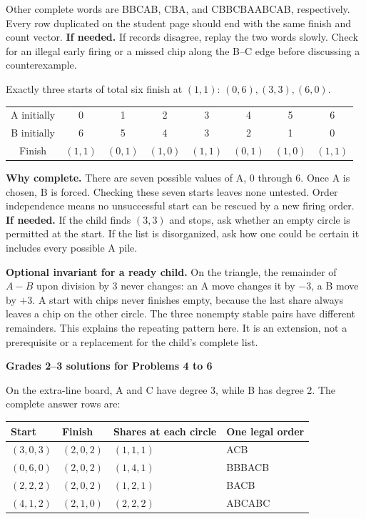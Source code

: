 \documentclass[11pt,letterpaper]{article}
\newcommand{\pagehead}[1]{{\Large\bfseries #1}\par\vspace{3pt}}
\newcommand{\prob}[2]{\par\vspace{5pt}{\large\bfseries #1}\par #2}
\newcommand{\hint}[1]{\textbf{If needed.} #1\par}
\begin{document}
Other complete words are BBCAB, CBA, and CBBCBAABCAB, respectively. Every row duplicated on the student page should end with the same finish and count vector.
\hint{If records disagree, replay the two words slowly. Check for an illegal early firing or a missed chip along the B--C edge before discussing a counterexample.}
\prob{Problem 3}{Exactly three starts of total six finish at $(1,1)$: $(0,6),(3,3),(6,0)$.}
\begin{center}\begin{tabular}{cccccccc}\toprule
A initially&0&1&2&3&4&5&6\\
B initially&6&5&4&3&2&1&0\\\midrule
Finish&$(1,1)$&$(0,1)$&$(1,0)$&$(1,1)$&$(0,1)$&$(1,0)$&$(1,1)$\\\bottomrule\end{tabular}\end{center}
\textbf{Why complete.} There are seven possible values of A, 0 through 6. Once A is chosen, B is forced. Checking these seven starts leaves none untested. Order independence means no unsuccessful start can be rescued by a new firing order.
\hint{If the child finds $(3,3)$ and stops, ask whether an empty circle is permitted at the start. If the list is disorganized, ask how one could be certain it includes every possible A pile.}
\textbf{Optional invariant for a ready child.} On the triangle, the remainder of $A-B$ upon division by 3 never changes: an A move changes it by $-3$, a B move by $+3$. A start with chips never finishes empty, because the last share always leaves a chip on the other circle. The three nonempty stable pairs have different remainders. This explains the repeating pattern here. It is an extension, not a prerequisite or a replacement for the child's complete list.

\newpage
\pagehead{Grades 2--3 solutions for Problems 4 to 6}\label{middleextra}
\prob{Problem 4}{On the extra-line board, A and C have degree 3, while B has degree 2. The complete answer rows are:}
\begin{center}\begin{tabular}{llll}\toprule Start & Finish & Shares at each circle & One legal order\\\midrule
$(3,0,3)$ & $(2,0,2)$ & $(1,1,1)$ & ACB\\
$(0,6,0)$ & $(2,0,2)$ & $(1,4,1)$ & BBBACB\\
$(2,2,2)$ & $(2,0,2)$ & $(1,2,1)$ & BACB\\
$(4,1,2)$ & $(2,1,0)$ & $(2,2,2)$ & ABCABC\\
\bottomrule\end{tabular}\end{center}
\end{document}
